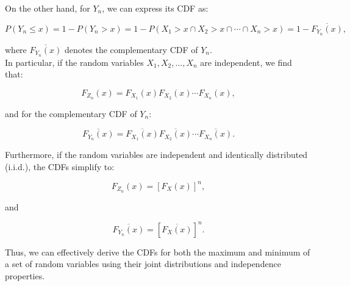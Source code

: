 On the other hand, for \( Y_n \), we can express its CDF as:

\[
P(Y_n \leq x) = 1 - P(Y_n > x) = 1 - P(X_1 > x \cap X_2 > x \cap \cdots \cap X_n > x) = 1 - \overline{F_{Y_n}(x)},
\]

where \( \overline{F_{Y_n}(x)} \) denotes the complementary CDF of \( Y_n \). \\

In particular, if the random variables \( X_1, X_2, \ldots, X_n \) are independent, we find that:

\[
F_{Z_n}(x) = F_{X_1}(x) F_{X_2}(x) \cdots F_{X_n}(x),
\]

and for the complementary CDF of \( Y_n \):

\[
\overline{F_{Y_n}(x)} = \overline{F_{X_1}(x)} \overline{F_{X_2}(x)} \cdots \overline{F_{X_n}(x)}.
\]

Furthermore, if the random variables are independent and identically distributed (i.i.d.), the CDFs simplify to:

\[
F_{Z_n}(x) = [F_X(x)]^n,
\]

and

\[
\overline{F_{Y_n}(x)} = [\overline{F_X(x)}]^n.
\]

Thus, we can effectively derive the CDFs for both the maximum and minimum of a set of random variables using their joint distributions and independence properties.

